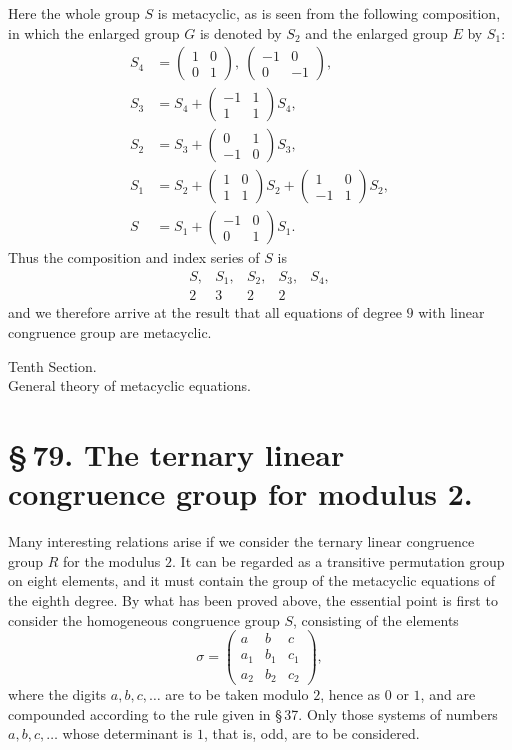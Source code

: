 \documentclass[11pt]{article}
\providecommand{\mat}[4]{\begin{pmatrix}#1&#2\\#3&#4\end{pmatrix}}
\providecommand{\mmat}[9]{\begin{pmatrix}#1&#2&#3\\#4&#5&#6\\#7&#8&#9\end{pmatrix}}
\providecommand{\mat}[4]{\begin{pmatrix}#1&#2\\#3&#4\end{pmatrix}}
\providecommand{\mmat}[9]{\begin{pmatrix}#1&#2&#3\\#4&#5&#6\\#7&#8&#9\end{pmatrix}}
\providecommand{\mat}[1]{\begin{pmatrix}#1\end{pmatrix}}
\begin{document}
Here the whole group $S$ is metacyclic, as is seen from the following composition, in which the enlarged group $G$ is denoted by $S_2$ and the enlarged group $E$ by $S_1$:
\begin{align*}
 S_4&=\mat{1}{0}{0}{1},\ \mat{-1}{0}{0}{-1},\\
 S_3&=S_4+\mat{-1}{1}{1}{1}S_4,\\
 S_2&=S_3+\mat{0}{1}{-1}{0}S_3,\\
 S_1&=S_2+\mat{1}{0}{1}{1}S_2+\mat{1}{0}{-1}{1}S_2,\\
 S&=S_1+\mat{-1}{0}{0}{1}S_1.
\end{align*}
Thus the composition and index series of $S$ is
\[
 \begin{array}{ccccc}
 S,&S_1,&S_2,&S_3,&S_4,\\
 2&3&2&2&
 \end{array}
\]
and we therefore arrive at the result that all equations of degree $9$ with linear congruence group are metacyclic.




\begin{center}
{\large Tenth Section.}\\[0.4em]
{\large General theory of metacyclic equations.}
\end{center}

\section*{\S\,79. The ternary linear congruence group for modulus 2.}

Many interesting relations arise if we consider the ternary linear congruence group $R$ for the modulus $2$. It can be regarded as a transitive permutation group on eight elements, and it must contain the group of the metacyclic equations of the eighth degree. By what has been proved above, the essential point is first to consider the homogeneous congruence group $S$, consisting of the elements
\begin{equation}
 \sigma=\mmat{a}{b}{c}{a_1}{b_1}{c_1}{a_2}{b_2}{c_2},
 \tag{1}
\end{equation}
where the digits $a,b,c,\ldots$ are to be taken modulo $2$, hence as $0$ or $1$, and are compounded according to the rule given in \S\,37. Only those systems of numbers $a,b,c,\ldots$ whose determinant is $1$, that is, odd, are to be considered.
\end{document}
